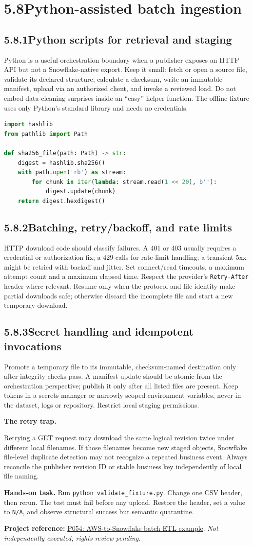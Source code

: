 \documentclass[11pt,twoside]{article}
\newcommand{\topic}[2]{\subsection*{#1\quad #2}}
\newcommand{\repo}[2]{\par\begingroup\fontsize{8.0}{9.6}\selectfont\sffamily\color{inkgray}\textbf{Project reference:} \href{#2}{#1}. \textit{Not independently executed; rights review pending.}\par\endgroup}
\begin{document}
\section*{5.8\quad Python-assisted batch ingestion}
\topic{5.8.1}{Python scripts for retrieval and staging}
Python is a useful orchestration boundary when a publisher exposes an HTTP API but not a Snowflake-native export. Keep it small: fetch or open a source file, validate its declared structure, calculate a checksum, write an immutable manifest, upload via an authorized client, and invoke a reviewed load. Do not embed data-cleaning surprises inside an ``easy'' helper function. The offline fixture uses only Python's standard library and needs no credentials.

\begin{lstlisting}[language=Python,caption={Core idea: a local file identity is byte-based.}]
import hashlib
from pathlib import Path

def sha256_file(path: Path) -> str:
    digest = hashlib.sha256()
    with path.open('rb') as stream:
        for chunk in iter(lambda: stream.read(1 << 20), b''):
            digest.update(chunk)
    return digest.hexdigest()
\end{lstlisting}
\topic{5.8.2}{Batching, retry/backoff, and rate limits}
HTTP download code should classify failures. A 401 or 403 usually requires a credential or authorization fix; a 429 calls for rate-limit handling; a transient 5xx might be retried with backoff and jitter. Set connect/read timeouts, a maximum attempt count and a maximum elapsed time. Respect the provider's \texttt{Retry-After} header where relevant. Resume only when the protocol and file identity make partial downloads safe; otherwise discard the incomplete file and start a new temporary download.

\topic{5.8.3}{Secret handling and idempotent invocations}
Promote a temporary file to its immutable, checksum-named destination only after integrity checks pass. A manifest update should be atomic from the orchestration perspective; publish it only after all listed files are present. Keep tokens in a secrets manager or narrowly scoped environment variables, never in the dataset, logs or repository. Restrict local staging permissions.

\begin{insight}\textbf{The retry trap.}\par
Retrying a GET request may download the same logical revision twice under different local filenames. If those filenames become new staged objects, Snowflake file-level duplicate detection may not recognize a repeated business event. Always reconcile the publisher revision ID or stable business key independently of local file naming.\end{insight}
\textbf{Hands-on task.} Run \texttt{python validate\_fixture.py}. Change one CSV header, then rerun. The test must fail before any upload. Restore the header, set a value to \texttt{N/A}, and observe structural success but semantic quarantine.
\repo{P054: AWS-to-Snowflake batch ETL example}{https://github.com/camposvinicius/aws-snowflake-etl}
\newpage
\end{document}
